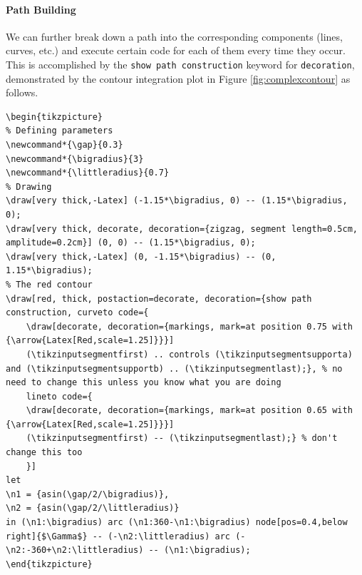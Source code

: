 \paragraph{Path Building}
We can further break down a path into the corresponding components (lines, curves, etc.) and execute certain code for each of them every time they occur. This is accomplished by the \texttt{show path construction} keyword for \texttt{decoration}, demonstrated by the contour integration plot in Figure \ref{fig:complexcontour} as follows.
\begin{lstlisting}
\begin{tikzpicture}
% Defining parameters
\newcommand*{\gap}{0.3}
\newcommand*{\bigradius}{3}
\newcommand*{\littleradius}{0.7}
% Drawing
\draw[very thick,-Latex] (-1.15*\bigradius, 0) -- (1.15*\bigradius, 0);
\draw[very thick, decorate, decoration={zigzag, segment length=0.5cm, amplitude=0.2cm}] (0, 0) -- (1.15*\bigradius, 0);
\draw[very thick,-Latex] (0, -1.15*\bigradius) -- (0, 1.15*\bigradius);
% The red contour
\draw[red, thick, postaction=decorate, decoration={show path construction, curveto code={
    \draw[decorate, decoration={markings, mark=at position 0.75 with {\arrow{Latex[Red,scale=1.25]}}}] 
    (\tikzinputsegmentfirst) .. controls (\tikzinputsegmentsupporta) and (\tikzinputsegmentsupportb) .. (\tikzinputsegmentlast);}, % no need to change this unless you know what you are doing
    lineto code={
    \draw[decorate, decoration={markings, mark=at position 0.65 with {\arrow{Latex[Red,scale=1.25]}}}] 
    (\tikzinputsegmentfirst) -- (\tikzinputsegmentlast);} % don't change this too
    }]  
let
\n1 = {asin(\gap/2/\bigradius)},
\n2 = {asin(\gap/2/\littleradius)}
in (\n1:\bigradius) arc (\n1:360-\n1:\bigradius) node[pos=0.4,below right]{$\Gamma$} -- (-\n2:\littleradius) arc (-\n2:-360+\n2:\littleradius) -- (\n1:\bigradius);
\end{tikzpicture}
\end{lstlisting}
